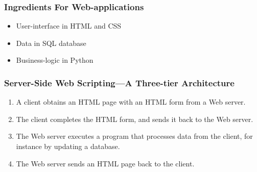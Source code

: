 \documentclass[dvipsnames]{beamer}
\subtitle{Database Driven Web-applications}
\begin{document}
\begin{frame}
  \titlepage{}
\end{frame}

\begin{frame}
  \frametitle{Ingredients For Web-applications}
  
  \begin{itemize}
  \item User-interface in HTML and CSS
  \item Data in SQL database
  \item Business-logic in Python
  \end{itemize}

\end{frame}


\begin{frame}
\frametitle{Server-Side Web Scripting---A Three-tier Architecture}

\begin{center}
\end{center}


\begin{enumerate}
\item A client obtains an HTML page with an HTML form from a Web server.
\item<2-> The client completes the HTML form, and sends it back to the
  Web server.
\item<3-> The Web server executes a program that processes data from
  the client, for instance by updating a database.
\item<4-> The Web server sends an HTML page back to the client.
\end{enumerate}


\end{frame}
\end{document}
